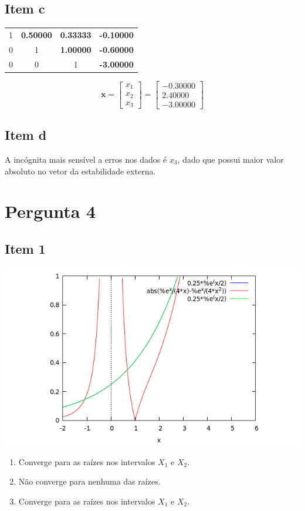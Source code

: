 {\subsection{Item c}
\begin{center}
    \begin{tabular}{ c c c | c}
        1 & \textbf{0.50000} & \textbf{0.33333} & \textbf{-0.10000} \\
        0 & 1 & \textbf{1.00000} & \textbf{-0.60000} \\
        0 & 0 & 1 & \textbf{-3.00000}
    \end{tabular}
\end{center}
\begin{equation*}
    \mathbf{x}
    =\begin{bmatrix} x_1 \\ x_2 \\ x_3 \end{bmatrix}
    =\begin{bmatrix} -0.30000 \\ 2.40000 \\ -3.00000 \end{bmatrix}
\end{equation*}
\subsection{Item d}
A incógnita mais sensível a erros nos dados é $x_3$, dado que possui maior valor absoluto no vetor da estabilidade externa.

}
\section{Pergunta 4}
\subsection{Item 1}

\begin{center} \includegraphics[scale=0.45]{2015E_4} \end{center}
\begin{enumerate}[label=\alph*)]
    \item Converge para as raízes nos intervalos $X_1$ e $X_2$.
    \item Não converge para nenhuma das raízes.
    \item Converge para as raízes nos intervalos $X_1$ e $X_2$.
\end{enumerate}
